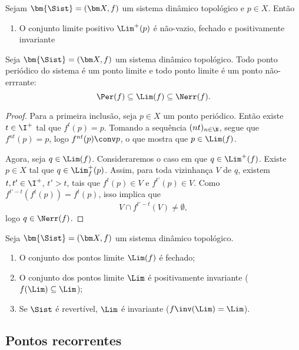 \begin{proposition}
Sejam $\bm{\Sist}=(\bm X,f)$ um sistema dinâmico topológico e $p \in X$. Então
	\begin{enumerate}
	\item O conjunto limite positivo $\Lim^+(p)$ é não-vazio, fechado e positivamente invariante
	\end{enumerate}
\end{proposition}

\begin{proposition}
Seja $\bm{\Sist}=(\bm X,f)$ um sistema dinâmico topológico. Todo ponto periódico do sistema é um ponto limite e todo ponto limite é um ponto não-errrante:
	\begin{equation*}
	\Per(f) \subseteq \Lim(f) \subseteq \Nerr(f).
	\end{equation*}
\end{proposition}
\begin{proof}
Para a primeira inclusão, seja $p \in X$ um ponto periódico. Então existe $t \in \I^+$ tal que $f^t(p)=p$. Tomando a sequência $(nt)_{n \in \N}$, segue que $f^{nt}(p) = p$, logo $f^{nt}(p) \conv p$, o que mostra que $p \in \Lim(f)$.

Agora, seja $q \in \Lim(f)$. Consideraremos o caso em que $q \in \Lim^+(f)$. Existe $p \in X$ tal que $q \in \Lim^+_f(p)$. Assim,  para toda vizinhança $V$ de $q$, existem $t,t' \in \I^+$, $t'>t$, tais que $f^t(p) \in V$ e $f^{t'}(p) \in V$. Como $f^{t'-t}(f^t(p)) = f^t(p)$, isso implica que
	\begin{equation*}
	V \cap f^{t'-t}(V) \neq \emptyset,
	\end{equation*}
logo $q \in \Nerr(f)$.
\end{proof}


\begin{proposition}
Seja $\bm{\Sist}=(\bm X,f)$ um sistema dinâmico topológico.
	\begin{enumerate}
	\item O conjunto dos pontos limite $\Lim(f)$ é fechado;
	\item O conjunto dos pontos limite $\Lim$ é positivamente invariante ($f(\Lim) \subseteq \Lim$);
	\item Se $\Sist$ é revertível, $\Lim$ é invariante ($f\inv(\Lim) = \Lim$).
	\end{enumerate}
\end{proposition}

\subsection{Pontos recorrentes}

